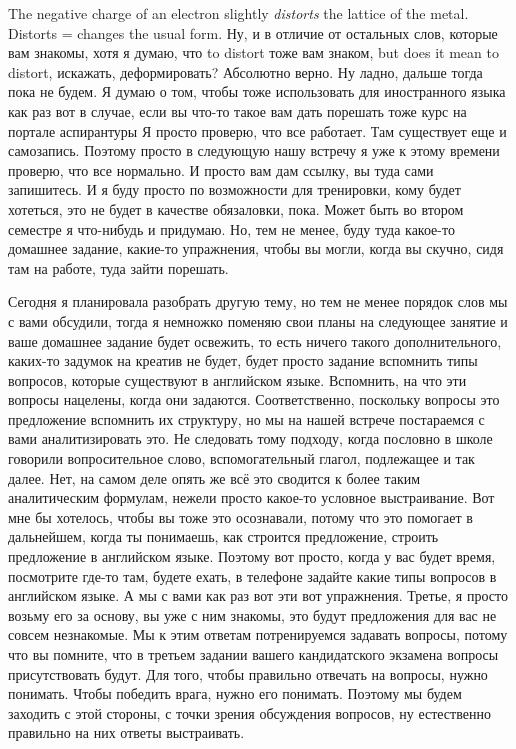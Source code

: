 \documentclass[main.tex]{subfiles}
\begin{document}
The negative charge of an electron slightly \textit{distorts} the lattice of the metal.
Distorts = changes the usual form.
Ну, и в отличие от остальных слов, которые вам знакомы, хотя я думаю, что to distort тоже вам знаком, but does it mean to distort, искажать, деформировать?
Абсолютно верно.
Ну ладно, дальше тогда пока не будем.
Я думаю о том, чтобы тоже использовать для иностранного языка как раз вот в случае, если вы что-то такое вам дать порешать тоже курс на портале аспирантуры
Я просто проверю, что все работает.
Там существует еще и самозапись.
Поэтому просто в следующую нашу встречу я уже к этому времени проверю, что все нормально.
И просто вам дам ссылку, вы туда сами запишитесь.
И я буду просто по возможности для тренировки, кому будет хотеться, это не будет в качестве обязаловки, пока.
Может быть во втором семестре я что-нибудь и придумаю.
Но, тем не менее, буду туда какое-то домашнее задание, какие-то упражнения, чтобы вы могли, когда вы скучно, сидя там на работе, туда зайти порешать.

Сегодня я планировала разобрать другую тему, но тем не менее порядок слов мы с вами обсудили, тогда я немножко поменяю свои планы на следующее занятие и ваше домашнее задание будет освежить, то есть ничего такого дополнительного, каких-то задумок на креатив не будет, будет просто задание вспомнить типы вопросов, которые существуют в английском языке.
Вспомнить, на что эти вопросы нацелены, когда они задаются.
Соответственно, поскольку вопросы это предложение вспомнить их структуру, но мы на нашей встрече постараемся с вами аналитизировать это.
Не следовать тому подходу, когда пословно в школе говорили вопросительное слово, вспомогательный глагол, подлежащее и так далее.
Нет, на самом деле опять же всё это сводится к более таким аналитическим формулам, нежели просто какое-то условное выстраивание.
Вот мне бы хотелось, чтобы вы тоже это осознавали, потому что это помогает в дальнейшем, когда ты понимаешь, как строится предложение, строить предложение в английском языке.
Поэтому вот просто, когда у вас будет время, посмотрите где-то там, будете ехать, в телефоне задайте какие типы вопросов в английском языке.
А мы с вами как раз вот эти вот упражнения.
Третье, я просто возьму его за основу, вы уже с ним знакомы, это будут предложения для вас не совсем незнакомые.
Мы к этим ответам потренируемся задавать вопросы, потому что вы помните, что в третьем задании вашего кандидатского экзамена вопросы присутствовать будут.
Для того, чтобы правильно отвечать на вопросы, нужно понимать.
Чтобы победить врага, нужно его понимать.
Поэтому мы будем заходить с этой стороны, с точки зрения обсуждения вопросов, ну естественно правильно на них ответы выстраивать.
\end{document}
